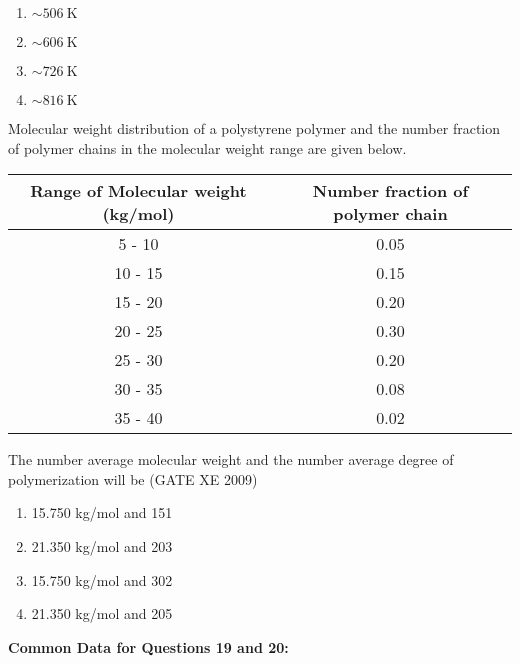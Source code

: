     \begin{multicols}{4}
        \begin{enumerate}
            \item $\sim 506 \ \text{K}$
            \item $\sim 606 \ \text{K}$
            \item $\sim 726 \ \text{K}$
            \item $\sim 816 \ \text{K}$
        \end{enumerate}
    \end{multicols}

    \item Molecular weight distribution of a polystyrene polymer and the number fraction of polymer chains in the molecular weight range are given below.

    \begin{table}[h!]
    \centering
    \begin{tabular}{|c|c|}
    \hline
    \textbf{Range of Molecular weight (kg/mol)} & \textbf{Number fraction of polymer chain} \\ \hline
    5 - 10   & 0.05 \\ \hline
    10 - 15  & 0.15 \\ \hline
    15 - 20  & 0.20 \\ \hline
    20 - 25  & 0.30 \\ \hline
    25 - 30  & 0.20 \\ \hline
    30 - 35  & 0.08 \\ \hline
    35 - 40  & 0.02 \\ \hline
    \end{tabular}
    \end{table}

    The number average molecular weight and the number average degree of polymerization will be \hfill (GATE XE 2009)

    \begin{multicols}{2}
        \begin{enumerate}
            \item 15.750 kg/mol and 151
            \item 21.350 kg/mol and 203
            \item 15.750 kg/mol and 302
            \item 21.350 kg/mol and 205
        \end{enumerate}
    \end{multicols}


    \item[] \textbf{Common Data for Questions 19 and 20:}

